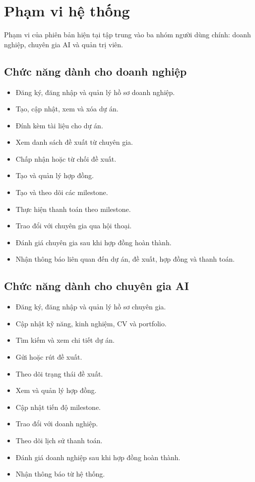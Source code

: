 \section{Phạm vi hệ thống}
\label{sec:system-scope}

Phạm vi của phiên bản hiện tại tập trung vào ba nhóm người dùng chính: doanh nghiệp, chuyên gia AI và quản trị viên.

\subsection{Chức năng dành cho doanh nghiệp}

\begin{itemize}
    \item Đăng ký, đăng nhập và quản lý hồ sơ doanh nghiệp.
    \item Tạo, cập nhật, xem và xóa dự án.
    \item Đính kèm tài liệu cho dự án.
    \item Xem danh sách đề xuất từ chuyên gia.
    \item Chấp nhận hoặc từ chối đề xuất.
    \item Tạo và quản lý hợp đồng.
    \item Tạo và theo dõi các milestone.
    \item Thực hiện thanh toán theo milestone.
    \item Trao đổi với chuyên gia qua hội thoại.
    \item Đánh giá chuyên gia sau khi hợp đồng hoàn thành.
    \item Nhận thông báo liên quan đến dự án, đề xuất, hợp đồng và thanh toán.
\end{itemize}

\subsection{Chức năng dành cho chuyên gia AI}

\begin{itemize}
    \item Đăng ký, đăng nhập và quản lý hồ sơ chuyên gia.
    \item Cập nhật kỹ năng, kinh nghiệm, CV và portfolio.
    \item Tìm kiếm và xem chi tiết dự án.
    \item Gửi hoặc rút đề xuất.
    \item Theo dõi trạng thái đề xuất.
    \item Xem và quản lý hợp đồng.
    \item Cập nhật tiến độ milestone.
    \item Trao đổi với doanh nghiệp.
    \item Theo dõi lịch sử thanh toán.
    \item Đánh giá doanh nghiệp sau khi hợp đồng hoàn thành.
    \item Nhận thông báo từ hệ thống.
\end{itemize}

